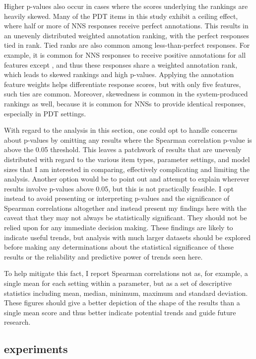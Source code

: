 Higher p-values also occur in cases where the scores underlying the rankings are heavily skewed. Many of the PDT items in this study exhibit a ceiling effect, where half or more of NNS responses receive perfect annotations. This results in an unevenly distributed weighted annotation ranking, with the perfect responses tied in rank. Tied ranks are also common among less-than-perfect responses. For example, it is common for NNS responses to receive positive annotations for all features except , and thus these responses share a weighted annotation rank, which leads to skewed rankings and high p-values. Applying the annotation feature weights helps differentiate response scores, but with only five features, such ties are common. Moreover, skewedness is common in the system-produced rankings as well, because it is common for NNSs to provide identical responses, especially in  PDT settings.

With regard to the analysis in this section, one could opt to handle concerns about p-values by omitting any results where the Spearman correlation p-value is above the 0.05 threshold. This leaves a patchwork of results that are unevenly distributed with regard to the various item types, parameter settings, and model sizes that I am interested in comparing, effectively complicating and limiting the analysis. Another option would be to point out and attempt to explain wherever results involve p-values above 0.05, but this is not practically feasible. I opt instead to avoid presenting or interpreting p-values and the significance of Spearman correlations altogether and instead present my findings here with the caveat that they may not always be statistically significant. They should not be relied upon for any immediate decision making. These findings are likely to indicate useful trends, but analysis with much larger datasets should be explored before making any determinations about the statistical significance of these results or the reliability and predictive power of trends seen here.

To help mitigate this fact, I report Spearman correlations not as, for example, a single mean for each setting within a parameter, but as a set of descriptive statistics including mean, median, minimum, maximum and standard deviation. These figures should give a better depiction of the shape of the results than a single mean score and thus better indicate potential trends and guide future research.

\subsection{ experiments}
\label{sec:exp-term-norm}

